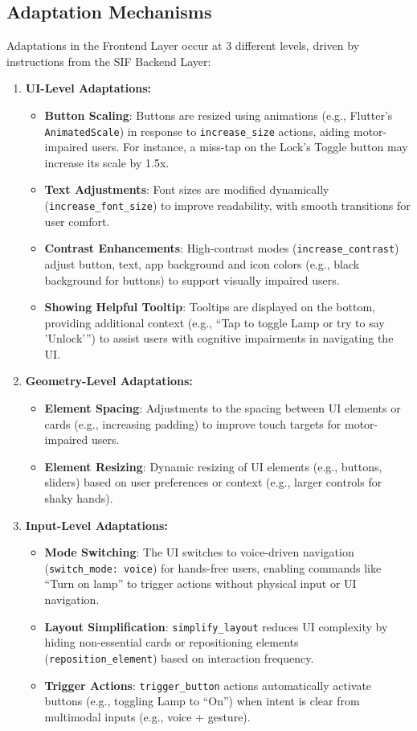 \documentclass[openany]{book}
\begin{document}
    \subsection{Adaptation Mechanisms}
    Adaptations in the Frontend Layer occur at 3 different levels, driven by instructions from the SIF Backend Layer:
    \begin{enumerate}
        \item \textbf{UI-Level Adaptations:}
        \begin{itemize}
            \item \textbf{Button Scaling}: Buttons are resized using animations (e.g., Flutter’s \verb|AnimatedScale|) in response to \verb|increase_size| actions, aiding motor-impaired users. For instance, a miss-tap on the Lock’s Toggle button may increase its scale by 1.5x.
            \item \textbf{Text Adjustments}: Font sizes are modified dynamically (\verb|increase_font_size|) to improve readability, with smooth transitions for user comfort.
            \item \textbf{Contrast Enhancements}: High-contrast modes (\verb|increase_contrast|) adjust button, text, app background and icon colors (e.g., black background for buttons) to support visually impaired users.
            \item \textbf{Showing Helpful Tooltip}: Tooltips are displayed on the bottom, providing additional context (e.g., “Tap to toggle Lamp or try to say 'Unlock'”) to assist users with cognitive impairments in navigating the UI.
        \end{itemize}
        \item \textbf{Geometry-Level Adaptations:}
        \begin{itemize}
            \item \textbf{Element Spacing}: Adjustments to the spacing between UI elements or cards (e.g., increasing padding) to improve touch targets for motor-impaired users.
            \item \textbf{Element Resizing}: Dynamic resizing of UI elements (e.g., buttons, sliders) based on user preferences or context (e.g., larger controls for shaky hands).
        \end{itemize}
        \item \textbf{Input-Level Adaptations:}
        \begin{itemize}
            \item \textbf{Mode Switching}: The UI switches to voice-driven navigation (\verb|switch_mode: voice|) for hands-free users, enabling commands like “Turn on lamp” to trigger actions without physical input or UI navigation.
            \item \textbf{Layout Simplification}: \verb|simplify_layout| reduces UI complexity by hiding non-essential cards or repositioning elements (\verb|reposition_element|) based on interaction frequency.
            \item \textbf{Trigger Actions}: \verb|trigger_button| actions automatically activate buttons (e.g., toggling Lamp to “On”) when intent is clear from multimodal inputs (e.g., voice + gesture).
        \end{itemize}
    \end{enumerate}
\end{document}
